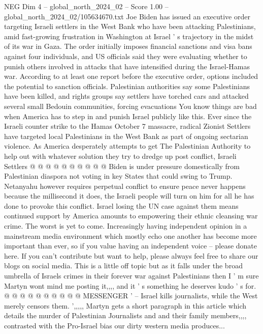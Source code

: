 \begin{textsample}{NEG Dim 4 – global\_north\_2024\_02 – Score 1.00 – global\_north\_2024\_02/105634670.txt}  \label{ex:f4_neg_288}
Joe Biden has issued an executive order targeting Israeli settlers in the West Bank who have been attacking Palestinians, amid fast-growing frustration in Washington at Israel ' s trajectory in the midst of its war in Gaza.
The order initially imposes financial sanctions and visa bans against four individuals, and US officials said they were evaluating whether to punish others involved in attacks that have intensified during the Israel-Hamas war.
According to at least one report before the executive order, options included the potential to sanction officials.
Palestinian authorities say some Palestinians have been killed, and rights groups say settlers have torched cars and attacked several small Bedouin communities, forcing evacuations You know things are bad when America has to step in and punish Israel publicly like this.
Ever since the Israeli counter strike to the Hamas October 7 massacre, radical Zionist Settlers have targeted local Palestinians in the West Bank as part of ongoing sectarian violence.
As America desperately attempts to get The Palestinian Authority to help out with whatever solution they try to dredge up post conflict, Israeli Settlers @ @ @ @ @ @ @ @ @ @ Biden is under pressure domestically from Palestinian diaspora not voting in key States that could swing to Trump.
Netanyahu however requires perpetual conflict to ensure peace never happens because the millisecond it does, the Israeli people will turn on him for all he has done to provoke this conflict.
Israel losing the UN case against them means continued support by America amounts to empowering their ethnic cleansing war crime.
The worst is yet to come.
Increasingly having independent opinion in a mainstream media environment which mostly echo one another has become more important than ever, so if you value having an independent voice -- please donate here.
If you can't contribute but want to help, please always feel free to share our blogs on social media.
This is a little off topic but as it falls under the broad umbrella of Israels crimes in their forever war against Palestinians then I ' m sure Martyn wont mind me posting it,,,, and it ' s something he deserves kudo ' s for. @ @ @ @ @ @ @ @ @ @ MESSENGER ' -- Israel kills journalists, while the West merely censors them. ',,,,, Martyn gets a short paragraph in this article which details the murder of Palestinian Journalists and and their family members,,,, contrasted with the Pro-Israel bias our dirty western media produces...

\end{textsample}
